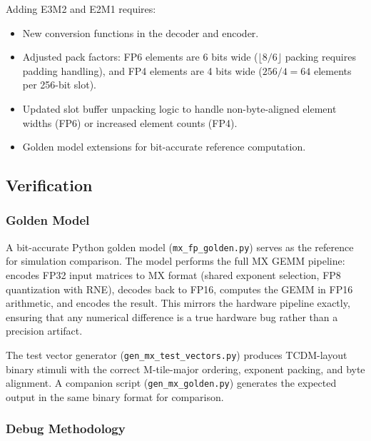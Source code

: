 Adding E3M2 and E2M1 requires:
\begin{itemize}
    \item New conversion functions in the decoder and encoder.
    \item Adjusted pack factors: FP6 elements are 6 bits wide
          ($\lfloor 8/6 \rfloor$ packing requires padding handling), and FP4
          elements are 4 bits wide ($256/4 = 64$ elements per 256-bit slot).
    \item Updated slot buffer unpacking logic to handle non-byte-aligned element
          widths (FP6) or increased element counts (FP4).
    \item Golden model extensions for bit-accurate reference computation.
\end{itemize}



\subsection{Verification}
\label{sec:verification}

\subsubsection{Golden Model}
\label{ssec:golden-model}

A bit-accurate Python golden model (\texttt{mx\_fp\_golden.py}) serves as the
reference for simulation comparison. The model performs the full MX GEMM
pipeline: encodes FP32 input matrices to MX format (shared exponent selection,
FP8 quantization with RNE), decodes back to FP16, computes the GEMM in FP16
arithmetic, and encodes the result. This mirrors the hardware pipeline exactly,
ensuring that any numerical difference is a true hardware bug rather than a
precision artifact.

The test vector generator (\texttt{gen\_mx\_test\_vectors.py}) produces
TCDM-layout binary stimuli with the correct M-tile-major ordering, exponent
packing, and byte alignment. A companion script
(\texttt{gen\_mx\_golden.py}) generates the expected output in the same binary
format for comparison.

\subsubsection{Debug Methodology}
\label{ssec:debug-methodology}

